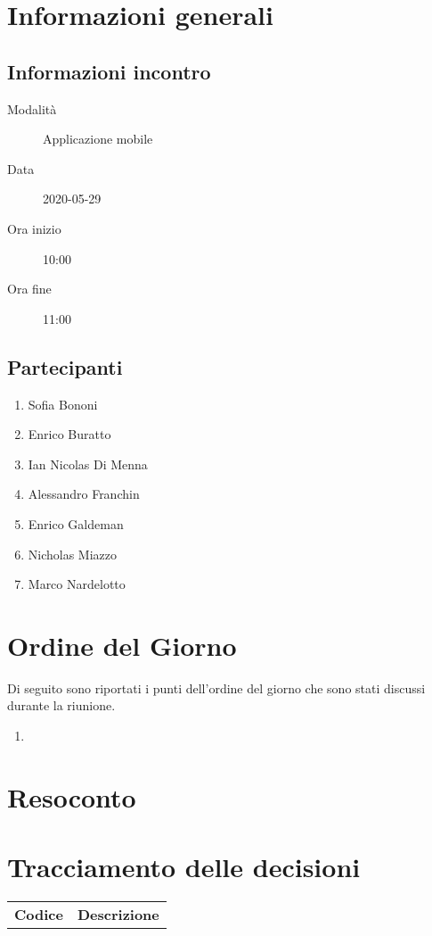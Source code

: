 \documentclass{article}
\begin{document}


\section{Informazioni generali}%
\label{sec:informazioni_generali}

\subsection{Informazioni incontro}%
\label{sub:informazioni_incontro}

\begin{description}
  \item[Modalità] Applicazione mobile 
  \item[Data] 2020-05-29
  \item[Ora inizio] 10:00
  \item[Ora fine] 11:00
\end{description}

\subsection{Partecipanti}%
\label{sub:partecipanti}

\begin{enumerate}
  \item Sofia Bononi
  \item Enrico Buratto
  \item Ian Nicolas Di Menna
  \item Alessandro Franchin
  \item Enrico Galdeman
  \item Nicholas Miazzo
  \item Marco Nardelotto
\end{enumerate}

\section{Ordine del Giorno}%
\label{ordine_del_giorno}
Di seguito sono riportati i punti dell'ordine del giorno che sono stati discussi durante la riunione.
\begin{enumerate}
  \item 
\end{enumerate}

\section{Resoconto}%
\label{resoconto}
\paragraph*{}

\section{Tracciamento delle decisioni}
\begin{table}[H]
  \centering
  \begin{tabular}{p{4cm}|p{12cm}}
    \rowcolor{lightgray}
    \textbf{Codice}  & \textbf{Descrizione}      \\
  \end{tabular}
\end{table}
\end{document}
